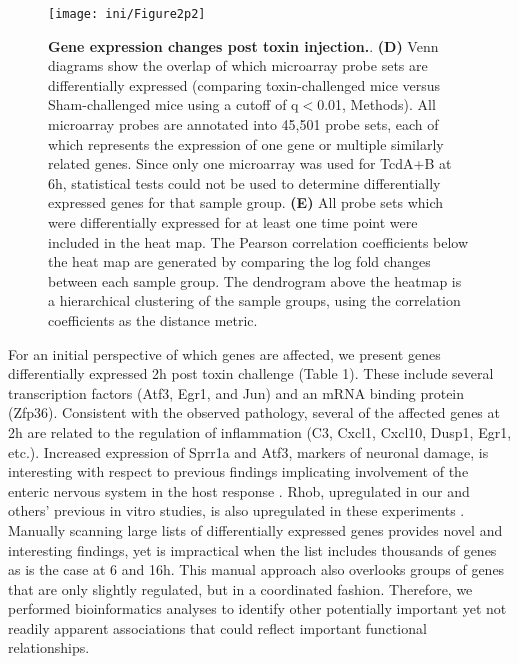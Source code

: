 \begin{SCfigure}
  \centering
  \texttt{[image: ini/Figure2p2]}
  \caption[Gene expression changes post toxin injection]{
       \textbf{Gene expression changes post toxin injection.}.
       \textbf{(D)} Venn diagrams show the overlap of which microarray probe sets are differentially expressed (comparing toxin-challenged mice versus Sham-challenged mice using a cutoff of q$<$0.01, Methods). All microarray probes are annotated into 45,501 probe sets, each of which represents the expression of one gene or multiple similarly related genes. Since only one microarray was used for TcdA+B at 6h, statistical tests could not be used to determine differentially expressed genes for that sample group. \textbf{(E)} All probe sets which were differentially expressed for at least one time point were included in the heat map. The Pearson correlation coefficients below the heat map are generated by comparing the log fold changes between each sample group. The dendrogram above the heatmap is a hierarchical clustering of the sample groups, using the correlation coefficients as the distance metric.    
  }
  \label{ini:fig2p2}
\end{SCfigure}

For an initial perspective of which genes are affected, we present genes differentially expressed 2h post toxin challenge (Table 1). These include several transcription factors (Atf3, Egr1, and Jun) and an mRNA binding protein (Zfp36). Consistent with the observed pathology, several of the affected genes at 2h are related to the regulation of inflammation (C3, Cxcl1, Cxcl10, Dusp1, Egr1, etc.). Increased expression of Sprr1a and Atf3, markers of neuronal damage, is interesting with respect to previous findings implicating involvement of the enteric nervous system in the host response \cite{Starkey:2009kn,Linhoff:2009dm}. Rhob, upregulated in our and others’ previous in vitro studies, is also upregulated in these experiments \cite{DAuria:2012bd,Gerhard:2005dg}. Manually scanning large lists of differentially expressed genes provides novel and interesting findings, yet is impractical when the list includes thousands of genes as is the case at 6 and 16h. This manual approach also overlooks groups of genes that are only slightly regulated, but in a coordinated fashion. Therefore, we performed bioinformatics analyses to identify other potentially important yet not readily apparent associations that could reflect important functional relationships.

